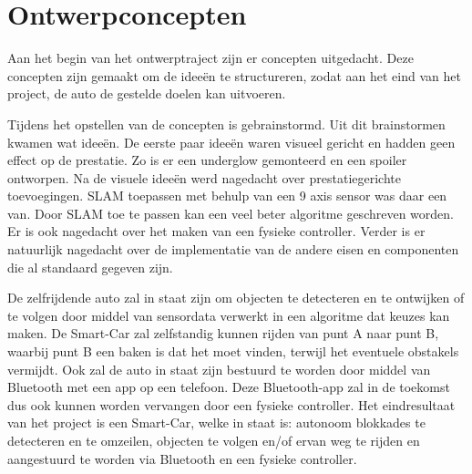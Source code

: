 \section{Ontwerpconcepten}
Aan het begin van het ontwerptraject zijn er concepten uitgedacht. Deze concepten zijn gemaakt om de ideeën te structureren, zodat aan het eind van het project, de auto de gestelde doelen kan uitvoeren. 

Tijdens het opstellen van de concepten is gebrainstormd. Uit dit brainstormen kwamen wat ideeën. De eerste paar ideeën waren visueel gericht en hadden geen effect op de prestatie. Zo is er een \gls{underglow} gemonteerd en een spoiler ontworpen. 
Na de visuele ideeën werd nagedacht over prestatiegerichte toevoegingen. \gls{SLAM} toepassen met behulp van een 9 axis sensor was daar een van. Door \gls{SLAM} toe te passen kan een veel beter algoritme geschreven worden. Er is ook nagedacht over het maken van een fysieke controller. 
Verder is er natuurlijk nagedacht over de implementatie van de andere eisen en componenten die al standaard gegeven zijn. 

De zelfrijdende auto zal in staat zijn om objecten te detecteren en te ontwijken of te volgen door middel van sensordata verwerkt in een algoritme dat keuzes kan maken. De \gls{Smart-Car} zal zelfstandig kunnen rijden van punt A naar punt B, waarbij punt B een baken is dat het moet vinden, terwijl het eventuele obstakels vermijdt. 
Ook zal de auto in staat zijn bestuurd te worden door middel van \gls{Bluetooth} met een app op een telefoon. Deze \gls{Bluetooth}-app zal in de toekomst dus ook kunnen worden vervangen door een fysieke controller.
Het eindresultaat van het project is een \gls{Smart-Car}, welke in staat is: \gls{autonoom} blokkades te detecteren en te omzeilen, objecten te volgen en/of ervan weg te rijden en aangestuurd te worden via \gls{Bluetooth} en een fysieke controller. 
